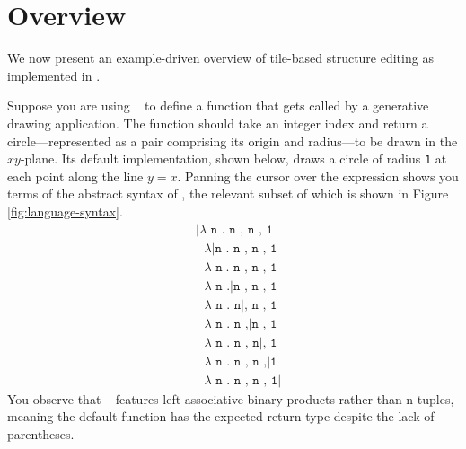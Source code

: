 \section{Overview}\label{sec:overview}






We now present an example-driven overview of tile-based
structure editing as implemented in \tylr.

Suppose you are using \tylr~ to define a function that gets called by a
generative drawing application.
The function should take an integer index and
return a circle---represented as a pair comprising
its origin and radius---to be drawn in the $xy$-plane.
Its default implementation, shown below, draws a circle
of radius \texttt{1} at each point along the line $y = x$.
Panning the cursor over the expression shows you terms of
the abstract syntax of \tylr, the relevant subset of which
is shown in Figure \ref{fig:language-syntax}.
\begin{align*}
  & \texttt{|$\lambda$ n . n , n , 1} \\
  & \texttt{\ $\lambda$|n . n , n , 1} \\
  & \texttt{\ $\lambda$ n|. n , n , 1} \\
  & \texttt{\ $\lambda$ n .|n , n , 1} \\
  & \texttt{\ $\lambda$ n . n|, n , 1} \\
  & \texttt{\ $\lambda$ n . n ,|n , 1} \\
  & \texttt{\ $\lambda$ n . n , n|, 1} \\
  & \texttt{\ $\lambda$ n . n , n ,|1} \\
  & \texttt{\ $\lambda$ n . n , n , 1|}
\end{align*}
You observe that \tylr~ features left-associative binary
products rather than n-tuples, meaning the default function
has the expected return type despite the lack of parentheses.

